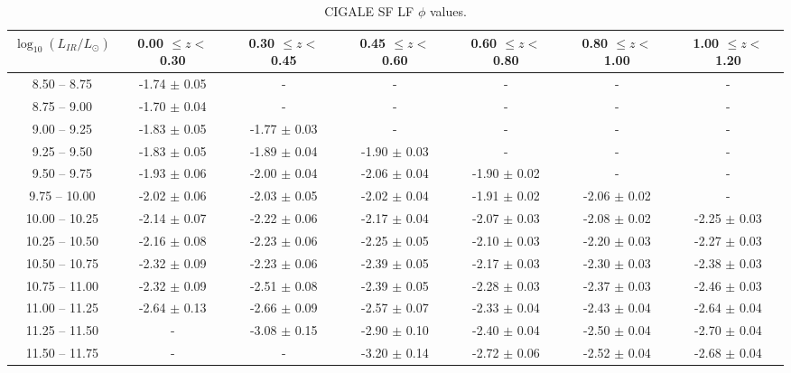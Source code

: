 \begin{table*}
    \begin{center}
    \caption{CIGALE SF LF $\phi$ values.}
    \label{Tab: CG SF LF}
    \begin{tabular}{@{}ccccccc@{}}
        \toprule
        $\log_{10}(L_{IR}/L_{\odot})$ & 0.00 $\leq z <$ 0.30 & 0.30 $\leq z <$ 0.45 & 0.45 $\leq z <$ 0.60 & 0.60 $\leq z <$ 0.80 & 0.80 $\leq z <$ 1.00 & 1.00 $\leq z <$ 1.20 \\
        \hline
         8.50 --  8.75 & -1.74 $\pm$ 0.05   & - & - & - & - & - \\
         8.75 --  9.00 & -1.70 $\pm$ 0.04   & - & - & - & - & - \\
         9.00 --  9.25 & -1.83 $\pm$ 0.05   & -1.77 $\pm$ 0.03  & - & - & - & - \\
         9.25 --  9.50 & -1.83 $\pm$ 0.05   & -1.89 $\pm$ 0.04  & -1.90 $\pm$ 0.03  & - & - & - \\
         9.50 --  9.75 & -1.93 $\pm$ 0.06   & -2.00 $\pm$ 0.04  & -2.06 $\pm$ 0.04  & -1.90 $\pm$ 0.02  & - & - \\
         9.75 -- 10.00 & -2.02 $\pm$ 0.06   & -2.03 $\pm$ 0.05  & -2.02 $\pm$ 0.04  & -1.91 $\pm$ 0.02  & -2.06 $\pm$ 0.02  & - \\
        10.00 -- 10.25 & -2.14 $\pm$ 0.07   & -2.22 $\pm$ 0.06  & -2.17 $\pm$ 0.04  & -2.07 $\pm$ 0.03  & -2.08 $\pm$ 0.02  & -2.25 $\pm$ 0.03 \\
        10.25 -- 10.50 & -2.16 $\pm$ 0.08   & -2.23 $\pm$ 0.06  & -2.25 $\pm$ 0.05  & -2.10 $\pm$ 0.03  & -2.20 $\pm$ 0.03  & -2.27 $\pm$ 0.03 \\
        10.50 -- 10.75 & -2.32 $\pm$ 0.09   & -2.23 $\pm$ 0.06  & -2.39 $\pm$ 0.05  & -2.17 $\pm$ 0.03  & -2.30 $\pm$ 0.03  & -2.38 $\pm$ 0.03 \\
        10.75 -- 11.00 & -2.32 $\pm$ 0.09   & -2.51 $\pm$ 0.08  & -2.39 $\pm$ 0.05  & -2.28 $\pm$ 0.03  & -2.37 $\pm$ 0.03  & -2.46 $\pm$ 0.03 \\
        11.00 -- 11.25 & -2.64 $\pm$ 0.13   & -2.66 $\pm$ 0.09  & -2.57 $\pm$ 0.07  & -2.33 $\pm$ 0.04  & -2.43 $\pm$ 0.04  & -2.64 $\pm$ 0.04 \\
        11.25 -- 11.50 & -                  & -3.08 $\pm$ 0.15  & -2.90 $\pm$ 0.10  & -2.40 $\pm$ 0.04  & -2.50 $\pm$ 0.04  & -2.70 $\pm$ 0.04 \\
        11.50 -- 11.75 & -                  & -                 & -3.20 $\pm$ 0.14  & -2.72 $\pm$ 0.06  & -2.52 $\pm$ 0.04  & -2.68 $\pm$ 0.04 \\

\end{tabular}
\end{center}
\end{table*}
